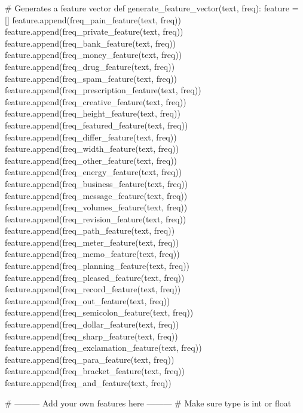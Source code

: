 \documentclass[11pt]{article}
\begin{document}
\begin{python}
{# Generates a feature vector
def generate_feature_vector(text, freq):
    feature = []
    feature.append(freq_pain_feature(text, freq))
    feature.append(freq_private_feature(text, freq))
    feature.append(freq_bank_feature(text, freq))
    feature.append(freq_money_feature(text, freq))
    feature.append(freq_drug_feature(text, freq))
    feature.append(freq_spam_feature(text, freq))
    feature.append(freq_prescription_feature(text, freq))
    feature.append(freq_creative_feature(text, freq))
    feature.append(freq_height_feature(text, freq))
    feature.append(freq_featured_feature(text, freq))
    feature.append(freq_differ_feature(text, freq))
    feature.append(freq_width_feature(text, freq))
    feature.append(freq_other_feature(text, freq))
    feature.append(freq_energy_feature(text, freq))
    feature.append(freq_business_feature(text, freq))
    feature.append(freq_message_feature(text, freq))
    feature.append(freq_volumes_feature(text, freq))
    feature.append(freq_revision_feature(text, freq))
    feature.append(freq_path_feature(text, freq))
    feature.append(freq_meter_feature(text, freq))
    feature.append(freq_memo_feature(text, freq))
    feature.append(freq_planning_feature(text, freq))
    feature.append(freq_pleased_feature(text, freq))
    feature.append(freq_record_feature(text, freq))
    feature.append(freq_out_feature(text, freq))
    feature.append(freq_semicolon_feature(text, freq))
    feature.append(freq_dollar_feature(text, freq))
    feature.append(freq_sharp_feature(text, freq))
    feature.append(freq_exclamation_feature(text, freq))
    feature.append(freq_para_feature(text, freq))
    feature.append(freq_bracket_feature(text, freq))
    feature.append(freq_and_feature(text, freq))

    # --------- Add your own features here ---------
    # Make sure type is int or float

}
\end{python}
\end{document}
